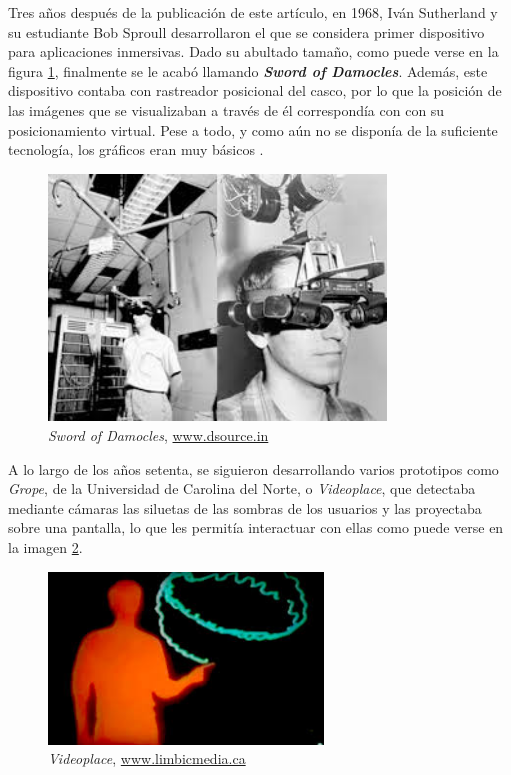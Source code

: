 Tres años después de la publicación de este artículo, en 1968, Iván Sutherland y su estudiante Bob Sproull desarrollaron el que se considera primer dispositivo para aplicaciones inmersivas. Dado su abultado tamaño, como puede verse en la figura \ref{fig:damocles}, finalmente se le acabó llamando \textbf{\textit{Sword of Damocles}}. Además, este dispositivo contaba con rastreador posicional del casco, por lo que la posición de las imágenes que se visualizaban a través de él correspondía con con su posicionamiento virtual. Pese a todo, y como aún no se disponía de la suficiente tecnología, los gráficos eran muy básicos \cite{lop-18}.

\vspace{0.1cm}

\begin{figure}[!h]
    \begin{center}
        \includegraphics[width=0.8\textwidth]{imagenes/2/damocles.jpg}
        \caption{\textit{Sword of Damocles}, \url{www.dsource.in}}
        \label{fig:damocles}
    \end{center}
\end{figure}

A lo largo de los años setenta, se siguieron desarrollando varios prototipos como \textit{Grope}, de la Universidad de Carolina del Norte, o \textit{Videoplace}, que detectaba mediante cámaras las siluetas de las sombras de los usuarios y las proyectaba sobre una pantalla, lo que les permitía interactuar con ellas \cite{gerv-99} como puede verse en la imagen \ref{fig:videoplace}.

\begin{figure}[H]
    \begin{center}
        \includegraphics[width=0.65\textwidth]{imagenes/2/videoplace.jpg}
        \caption{\textit{Videoplace}, \url{www.limbicmedia.ca}}
        \label{fig:videoplace}
    \end{center}
\end{figure}

